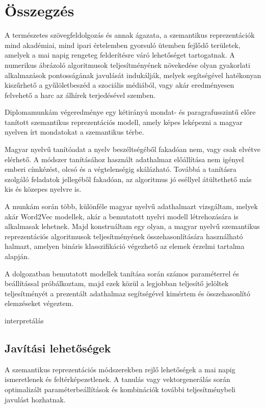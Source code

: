 \chapter{Összegzés} %
\label{ch:sum}

A természetes szövegfeldolgozás és annak ágazata, a szemantikus reprezentációk mind akadémiai, mind ipari értelemben gyorsuló ütemben fejlődő területek, amelyek a mai napig rengeteg felderítésre váró lehetőséget tartogatnak. A numerikus ábrázoló algoritmusok teljesítményének növekedése olyan gyakorlati alkalmazások pontosságának javulását indukálják, melyek segítségével hatékonyan kiszűrhető a gyűlöletbeszéd a szociális médiából, vagy akár eredményesen felvehető a harc az álhírek terjedésével szemben. 

Diplomamunkám végeredménye egy kétirányú mondat- és paragrafusszintű előre tanított szemantikus reprezentációs modell, amely képes leképezni a magyar nyelven írt mondatokat a szemantikus térbe.

Magyar nyelvű tanítóadat a nyelv beszéltségéből fakadóan nem, vagy csak elvétve elérhető. A módszer tanításához használt adathalmaz előállítása nem igényel emberi címkézést, olcsó és a végtelenségig skálázható. Továbbá a tanításra szolgáló feladatok jellegéből fakadóan, az algoritmus jó eséllyel átültethető más kis és közepes nyelvre is.

A munkám során több, különféle magyar nyelvű adathalmazt vizsgáltam, melyek akár Word2Vec modellek, akár a bemutatott nyelvi modell létrehozására is alkalmasak lehetnek. Majd konstruáltam egy olyan, a magyar nyelvű szemantikus reprezentációs algoritmusok teljesítményének összehasonlítására használható halmazt, amelyen bináris klasszifikáció végezhető az elemek érzelmi tartalma alapján.
 
A dolgozatban bemutatott modellek tanítása során számos paraméterrel és beállítással próbálkoztam, majd ezek közül a legjobban teljesítő jelöltek teljesítményét a prezentált adathalmaz segítségével kimértem és összehasonlító elemzéseket végeztem.

interpretálás



\section{Javítási lehetőségek}
A szemantikus reprezentációs módszerekben rejlő lehetőségek a mai napig ismeretlenek és feltérképezetlenek. A tanulás vagy vektorgenerálás során optimalizált paraméterbeállítások és kombinációk további teljesítménybeli javulást hozhatnak.

